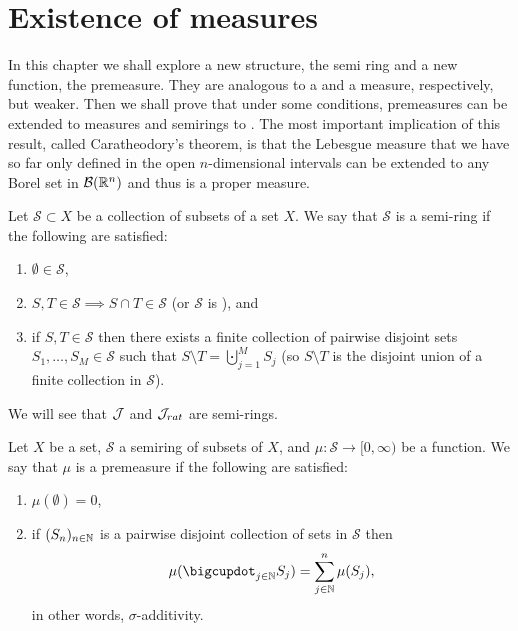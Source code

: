 
\chapter{Existence of measures}

In this chapter we shall explore a new structure, the semi ring and a new function, the premeasure. They are analogous to a \siga and a measure, respectively, but weaker. Then we shall prove that under some conditions, premeasures can be extended to measures and semirings to \sigas. The most important implication of this result, called Caratheodory's theorem, is that the Lebesgue measure that we have so far only defined in the open $n$-dimensional intervals can be extended to any Borel set in $\mathcal{B}(\mathbb{R}^n)$ and thus is a proper measure.

\newcommand{\sr}{\mathcal{S}}
\begin{dfn}
	Let $\sr \subset X$ be a collection of subsets of a set $X$. We say that $\sr$ is a semi-ring if the following are satisfied:
	\begin{enumerate}
		\item $\emptyset \in \sr$,
		\item $S, T \in \sr \implies S \cap T \in \sr$ (or $\sr$ is \istable), and
		\item if $S, T \in \sr$ then there exists a finite collection of pairwise disjoint sets $S_1, \dots, S_M \in \sr$ such that $S\setminus T = \bigcupdot_{j = 1}^M S_j$ (so $S\setminus T$ is the disjoint union of a finite collection in $\sr$).
	\end{enumerate}
\end{dfn}

We will see that $\mathcal{J}$ and $\mathcal{J}_{rat}$ are semi-rings.

\begin{dfn}[Premeasure]
	Let $X$ be a set, $\sr$ a semiring of subsets of $X$, and $\mu: \sr \to [0, \infty)$ be a function. We say that $\mu$ is a premeasure if the following are satisfied:
	\begin{enumerate}
		\item $\mu(\emptyset) = 0$,
		\item if $(S_n)_{n \in \mathbb{N}}$ is a pairwise disjoint collection of sets in $\sr$ then
		\begin{align*}
			\mu(\bigcupdot_{j \in \N} S_j) = \sum_{j \in \N}^n \mu(S_j),
		\end{align*}
		in other words, $\sigma$-additivity.
	\end{enumerate}
\end{dfn}

